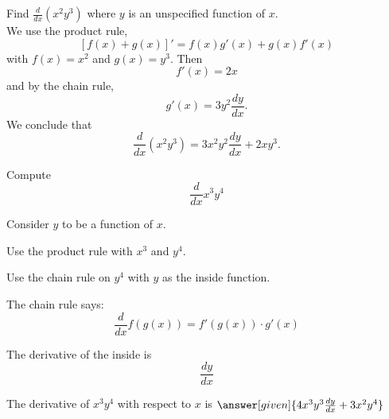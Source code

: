 \documentclass{ximera}
\begin{document}
\begin{example} %
Find $\frac{d}{dx} (x^2y^3)$ where $y$ is an unspecified function of $x$.\\
We use the product rule,
\[\displaystyle{[f(x) + g(x)]' = f(x)g'(x) + g(x)f'(x)}\]
with $f(x) = x^2$ and $g(x) = y^3$. Then 
\[f'(x) = 2x \]
and by the chain rule,
\[g'(x) = 3y^2\frac{dy}{dx}.\]
We conclude that
\[\frac{d}{dx} (x^2y^3) = 3x^2y^2\frac{dy}{dx} + 2xy^3.\]
\end{example}



\begin{center}
\begin{foldable}
\end{foldable}
\end{center}

\begin{question} %
  Compute
  \[
  \frac{d}{dx} x^3y^4
  \]
  
	  
    \begin{hint}
      Consider $y$ to be a function of $x$.
    \end{hint}
		\begin{hint}
      Use the product rule with $x^3$ and $y^4$.
    \end{hint}
    \begin{hint}
      Use the chain rule on $y^4$ with $y$ as the inside function.
    \end{hint}
    \begin{hint}
      The chain rule says:
      \[
      \frac{d}{dx} f(g(x)) = f'(g(x))\cdot g'(x)
      \]
    \end{hint}
    \begin{hint}
      The derivative of the inside is 
      \[
      \frac{dy}{dx}
      \]
    \end{hint}
    
		The derivative of $x^3 y^4$ with respect to $x$ is
		 $\answer[given]{4x^3 y^3 \frac{dy}{dx} + 3x^2y^4}$
		
\end{question}
\end{document}

